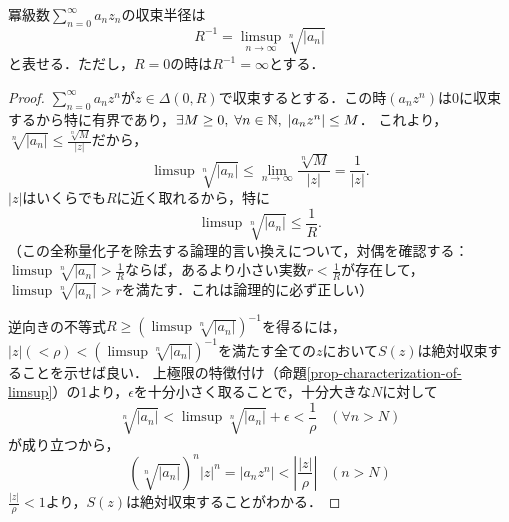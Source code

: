 \documentclass[uplatex, dvipdfmx]{jsreport}
\begin{document}
\begin{theorem}[冪級数の収束半径は係数列から定まる]
    冪級数$\sum^\infty_{n=0}a_nz_n$の収束半径は
    \[ R^{-1}=\limsup_{n\to\infty}\sqrt[n]{|a_n|} \]
    と表せる．ただし，$R=0$の時は$R^{-1}=\infty$とする．
\end{theorem}
\begin{proof}
    $\sum^\infty_{n=0}a_nz^n$が$z\in\Delta(0,R)$で収束するとする．この時$(a_nz^n)$は$0$に収束するから特に有界であり，$\exists M\ge 0,\; \forall n\in\mathbb{N},\; |a_nz^n|\le M$．
    これより，$\sqrt[n]{|a_n|}\le\frac{\sqrt[n]{M}}{|z|}$だから，
    \[ \limsup\sqrt[n]{|a_n|}\le\lim_{n\to\infty}\frac{\sqrt[n]{M}}{|z|}=\frac{1}{|z|}. \]
    $|z|$はいくらでも$R$に近く取れるから，特に
    \[ \limsup\sqrt[n]{|a_n|}\le\frac{1}{R}. \]
    （この全称量化子を除去する論理的言い換えについて，対偶を確認する：$\limsup\sqrt[n]{|a_n|}>\frac{1}{R}$ならば，あるより小さい実数$r<\frac{1}{R}$が存在して，$\limsup\sqrt[n]{|a_n|}>r$を満たす．これは論理的に必ず正しい）

    逆向きの不等式$R\ge(\limsup\sqrt[n]{|a_n|})^{-1}$を得るには，$|z|(<\rho)<(\limsup\sqrt[n]{|a_n|})^{-1}$を満たす全ての$z$において$S(z)$は絶対収束することを示せば良い．
    上極限の特徴付け（命題\ref{prop-characterization-of-limsup}）の1より，$\epsilon$を十分小さく取ることで，十分大きな$N$に対して
    \[ \sqrt[n]{|a_n|}<\limsup\sqrt[n]{|a_n|}+\epsilon<\frac{1}{\rho}\;\;\;(\forall n>N) \]
    が成り立つから，
    \[ (\sqrt[n]{|a_n|})^n|z|^n=|a_nz^n|<\left|\frac{|z|}{\rho}\right|\;\;\;(n>N) \]
    $\frac{|z|}{\rho}<1$より，$S(z)$は絶対収束することがわかる．
\end{proof}
\end{document}

